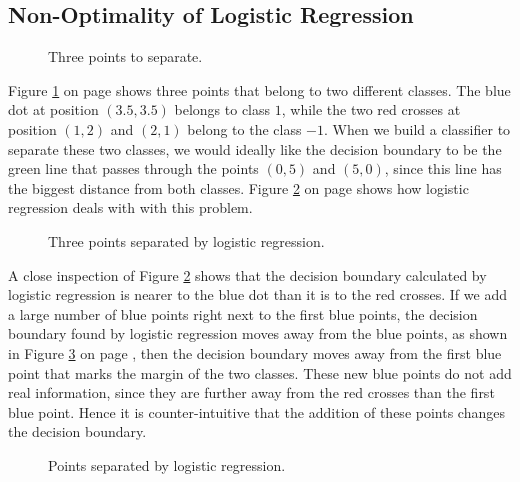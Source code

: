 \subsection{Non-Optimality of Logistic Regression}

\begin{figure}[!th]
\caption{Three points to separate.}
\label{fig:largest-margin.pdf}
\end{figure}

Figure \ref{fig:largest-margin.pdf} on page \pageref{fig:largest-margin.pdf} shows three points that belong to
two different classes.  The blue dot at position $(3.5, 3.5)$ belongs to class $1$, while the two red crosses
at position $(1,2)$ and $(2,1)$ belong to the class $-1$.  When we build a classifier to separate these two
classes, we would ideally like the decision boundary to be the green line that passes through the points $(0,5)$ and
$(5,0)$, since this line has the biggest distance from both classes.  Figure
\ref{fig:largest-margin-logistic.pdf} on page \pageref{fig:largest-margin-logistic.pdf} shows how logistic regression
deals with with this problem.

\begin{figure}[!th]
\caption{Three points separated by logistic regression.}
\label{fig:largest-margin-logistic.pdf}
\end{figure}

A close inspection of Figure \ref{fig:largest-margin-logistic.pdf} shows that the decision boundary calculated
by logistic regression is nearer to the blue dot than it is to the red crosses.  If we add a large number of
blue points right next to the first blue points, the decision boundary found by logistic regression moves away
from the blue points, as shown in Figure \ref{fig:largest-margin-more.pdf} on
page \pageref{fig:largest-margin-more.pdf},
then the decision boundary moves away from the first blue point that marks the margin of the two classes.
These new blue points do not add real information, since they are further away from the red crosses than the
first blue point.  Hence it is counter-intuitive that the addition of these points changes the decision boundary.

\begin{figure}[!th]
\caption{Points separated by logistic regression.}
\label{fig:largest-margin-more.pdf}
\end{figure}


